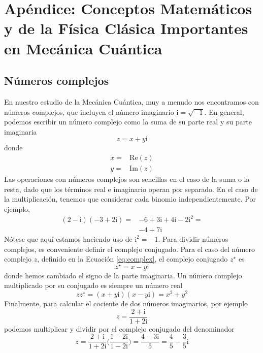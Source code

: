 \chapter{Apéndice: Conceptos Matemáticos y de la Física Clásica
Importantes en Mecánica Cuántica}

\section{Números complejos}
En nuestro estudio de la Mecánica Cuántica, muy a menudo nos
encontramos con números complejos, que incluyen el número imaginario
$\mathrm{i}=\sqrt{-1}$. En general, podemos escribir un número complejo
como la suma de su parte real y su parte imaginaria
\begin{equation}
    z= x+y\mathrm{i} 
    \label{eq:complex}
\end{equation}
donde
\begin{align}
    x=&\mathrm{Re}(z) \\
    y=&\mathrm{Im}(z) 
\end{align}
Las operaciones con números complejos son sencillas en el caso
de la suma o la resta, dado que los términos real e imaginario 
operan por separado. En el caso de la multiplicación, tenemos
que considerar cada binomio independientemente. Por ejemplo,
\begin{equation}
\begin{split}
    (2-\mathrm{i})(-3+2\mathrm{i}) = &
    -6 + 3\mathrm{i}+ 4\mathrm{i}- 2\mathrm{i}^2=\\
    &-4 + 7 \mathrm{i}
\end{split}
\end{equation}
Nótese que aquí estamos haciendo uso de $\mathrm{i}^2=-1$. Para
dividir números complejos, es conveniente definir el complejo
conjugado. Para el caso del número complejo $z$, definido en la
Ecuación \ref{eq:complex}, el complejo conjugado $z^\star$ es
\begin{equation}
    z^\star= x-y\mathrm{i} 
\end{equation}
donde hemos cambiado el signo de la parte imaginaria. Un número 
complejo multiplicado por su conjugado es siempre un número real
\begin{equation}
    zz^\star= (x+y\mathrm{i})(x-y\mathrm{i})= x^2+y^2
\end{equation}
Finalmente, para calcular el cociente de dos números imaginarios, 
por ejemplo
\begin{equation}
    z=\frac{2+\mathrm{i}}{1+2\mathrm{i}}
\end{equation}
podemos multiplicar y dividir por el complejo conjugado del
denominador
\begin{equation}
    z=\frac{2+\mathrm{i}}{1+2\mathrm{i}}\bigg(\frac{1-2\mathrm{i}}{1-2\mathrm{i}}\bigg)=\frac{4-3\mathrm{i}}{5}=\frac{4}{5}-\frac{3}{5}\mathrm{i}
\end{equation}


